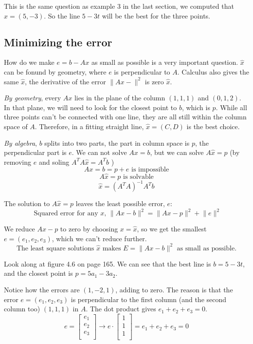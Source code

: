 This is the same question as example 3 in the last section, we computed that \(\hat{x} = (5, -3)\). So the line \(5 -3t\) will be the best for the three points. 

\subsection{Minimizing the error}

How do we make \(e = b - Ax\) as small as possible is a very important question. \(\hat{x}\) can be fonund by geometry, where \(e\) is perpendicular to \(A\). Calculus also gives the same \(\hat{x}\), the derivative of the error \(\lVert Ax -  \rVert^2 \) is zero \(\hat{x}\). 

\emph{By geometry}, every \(Ax\) lies in the plane of the column \((1, 1, 1)\) and \((0, 1, 2)\). In that plane, we will need to look for the closest point to \(b\), which is \(p\). While all three points can't be connected with one line, they are all still within the column space of \(A\). Therefore, in a fitting straight line, \(\hat{x} = (C, D)\) is the best choice. 

\emph{By algebra}, \(b\) splits into two parts, the part in column space is \(p\), the perpendicular part is \(e\). We can not solve \(Ax = b\), but we can solve \(A\hat{x} = p\) (by removing \(e\) and soling \(A^T A\hat{x} = A^T b\)  )
\[
    Ax = b = p + e 
    \text{ is impossible}
\]     
\[
    A\hat{x} = p 
    \text{ is solvable}
\]
\[
    \hat{x} = (A^T A)^{-1} A^T b  
\]

The solution to \(A\hat{x} = p\) leaves the least possible error, \(e\): 
\[
    \text{ Squared error for any \(x\), }
    \lVert Ax - b \rVert^2 = \lVert Ax - p \rVert^2 + \lVert e \rVert^2   
\]  

We reduce \(Ax - p\) to zero by choosing \(x = \hat{x}\), so we get the smallest \(e = (e_1, e_2, e_3)\), which we can't reduce further. 
\[
    \text{The least square solutions \(\hat{x}\) makes } E = \lVert Ax - b \rVert^2 \text{ as small as possible.} 
\]   

Look along at figure 4.6 on page 165. We can see that the best line is \(b = 5 - 3t\), and the closest point is \(p = 5a_1 - 3a_2\). 

Notice how the errors are \((1, -2, 1)\), adding to zero. The reason is that the error \(e = (e_1, e_2, e_3)\) is perpendicular to the first column (and the second column too) \((1, 1, 1)\) in \(A\). The dot product gives \(e_1 + e_2 + e_3 = 0\). 
\[
    e = \begin{bmatrix}
         e_1 \\
         e_2 \\
         e_3 \\
    \end{bmatrix}
    \rightarrow
    e \cdot
    \begin{bmatrix}
         1 \\
         1 \\
         1 \\
    \end{bmatrix}
    = 
    e_1 + e_2 + e_3 
    = 
    0
\]


